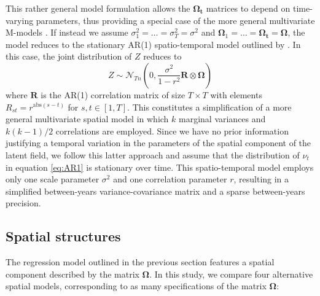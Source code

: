 \documentclass[openany, 11pt, oneside]{book}
\begin{document}
This rather general model formulation allows the $\boldsymbol{\boldsymbol{\Omega}_t}$ matrices to depend on time-varying parameters, thus providing a special case of the more general multivariate M-models \parencite{Mmodels}. If instead we assume $\sigma^2_1 = \dots=\sigma_T^2=\sigma^2$ and $\boldsymbol{\Omega}_1 = \dots = \boldsymbol{\boldsymbol{\Omega}_t}=\boldsymbol{\Omega}$, the model reduces to the stationary AR(1) spatio-temporal model outlined by \cite{martinez2008autoregressive}. In this case, the joint distribution of $Z$ reduces to
%
$$
Z \sim \mathcal{N}_{T n} \left(0, \frac{\sigma^2}{1-r^2} \boldsymbol{R} \otimes \boldsymbol{\Omega} \right)
$$
%
where $\boldsymbol{R}$ is the AR(1) correlation matrix of size $T \times T$ with elements $R_{st}=r^{\mathrm{abs}(s-t)}$ for $s, t \in [1,T]$.
%
This constitutes a simplification of a more general multivariate spatial model in which $k$ marginal variances and $k(k-1)/2$ correlations are employed.
%
Since we have no prior information justifying a temporal variation in the parameters of the spatial component of the latent field, we follow this latter approach and assume that the distribution of $\nu_t$ in equation \ref{eq:AR1} is stationary over time. 
%
This spatio-temporal model employs only one scale parameter $\sigma^2$ and one correlation parameter $r$, resulting in a simplified between-years variance-covariance matrix and a sparse between-years precision.

\subsection{Spatial structures}

The regression model outlined in the previous section features a spatial component described by the matrix $\boldsymbol{\Omega}$. In this study, we compare four alternative spatial models, corresponding to as many specifications of the matrix $\boldsymbol{\Omega}$:
\end{document}

